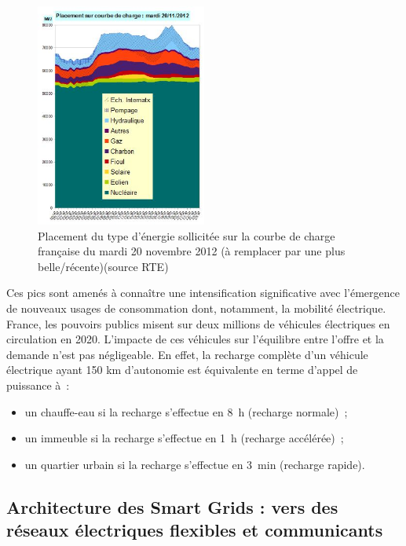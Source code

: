 \begin{figure}[!htbp]
 \begin{center}
  \includegraphics[width=0.5\textwidth]{images/problematique/ccharge.jpg}
 \end{center}
 \caption{Placement du type d'énergie sollicitée sur la courbe de charge 
française du mardi 20 novembre 2012 (à remplacer par une plus 
belle/récente)(source RTE)}
 \label{fig:courbeCharge}
\end{figure}

Ces pics sont amenés à connaître une intensification significative avec 
l'émergence de nouveaux usages de consommation dont, notamment, la mobilité 
électrique. France, les pouvoirs publics misent sur deux millions de véhicules 
électriques en circulation en 2020. L'impacte de ces véhicules sur l'équilibre 
entre l'offre et la demande n'est pas négligeable. En effet, la recharge 
complète d'un véhicule électrique ayant 150 km d'autonomie est équivalente en 
terme d'appel de puissance à~:
\begin{itemize}
\item un chauffe-eau si la recharge s'effectue en 8~h (recharge normale)~;
\item un immeuble si la recharge s'effectue en 1~h (recharge accélérée)~;
\item un quartier urbain si la recharge s'effectue en 3~min (recharge rapide).
\end{itemize}



\subsection{Architecture des Smart Grids : vers des réseaux électriques 
flexibles et communicants}

